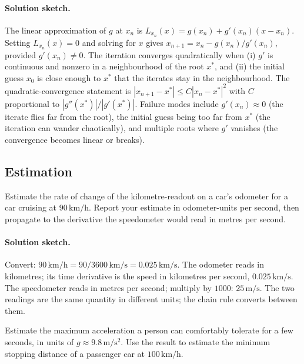 \paragraph{Solution sketch.}
The linear approximation of $g$ at $x_{n}$ is $L_{x_{n}}(x) =
g(x_{n}) + g'(x_{n}) (x - x_{n})$. Setting $L_{x_{n}}(x) = 0$ and
solving for $x$ gives $x_{n + 1} = x_{n} - g(x_{n})/g'(x_{n})$,
provided $g'(x_{n}) \neq 0$. The iteration converges quadratically
when (i) $g'$ is continuous and nonzero in a neighbourhood of the
root $x^{*}$, and (ii) the initial guess $x_{0}$ is close enough
to $x^{*}$ that the iterates stay in the neighbourhood. The
quadratic-convergence statement is $|x_{n+1} - x^{*}| \leq C
|x_{n} - x^{*}|^{2}$ with $C$ proportional to $|g''(x^{*})| /
|g'(x^{*})|$. Failure modes include $g'(x_{n}) \approx 0$ (the
iterate flies far from the root), the initial guess being too
far from $x^{*}$ (the iteration can wander chaotically), and
multiple roots where $g'$ vanishes (the convergence becomes
linear or breaks).

\subsection*{Estimation}

\begin{exercise}
Estimate the rate of change of the kilometre-readout on a car's
odometer for a car cruising at $90\,\si{\kilo\meter\per\hour}$.
Report your estimate in odometer-units per second, then propagate
to the derivative the speedometer would read in metres per second.
\end{exercise}

\paragraph{Solution sketch.}
Convert: $90 \,\si{\kilo\meter\per\hour} = 90 / 3600 \,\si{\kilo
\meter\per\second} = 0.025 \,\si{\kilo\meter\per\second}$. The
odometer reads in kilometres; its time derivative is the speed in
kilometres per second, $0.025 \,\si{\kilo\meter\per\second}$. The
speedometer reads in metres per second; multiply by $1000$:
$25 \,\si{\meter\per\second}$. The two readings are the same
quantity in different units; the chain rule converts between
them.

\begin{exercise}
Estimate the maximum acceleration a person can comfortably tolerate
for a few seconds, in units of $g \approx 9.8\,\si{\meter\per
\second\squared}$. Use the result to estimate the minimum
stopping distance of a passenger car at $100\,\si{\kilo\meter\per
\hour}$.
\end{exercise}


